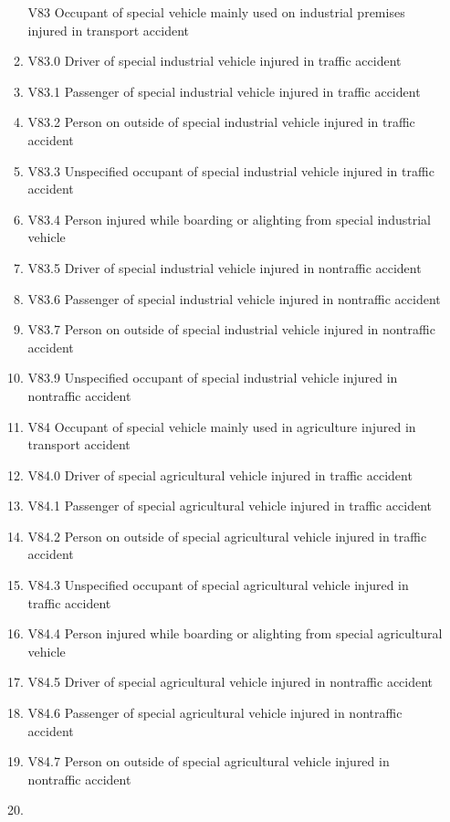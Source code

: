 \documentclass[
]{scrartcl}
\begin{document}
\begin{itemize}
\begin{enumerate}
    V83 Occupant of special vehicle mainly used on industrial premises
    injured in transport accident
  \item
    V83.0 Driver of special industrial vehicle injured in traffic
    accident
  \item
    V83.1 Passenger of special industrial vehicle injured in traffic
    accident
  \item
    V83.2 Person on outside of special industrial vehicle injured in
    traffic accident
  \item
    V83.3 Unspecified occupant of special industrial vehicle injured in
    traffic accident
  \item
    V83.4 Person injured while boarding or alighting from special
    industrial vehicle
  \item
    V83.5 Driver of special industrial vehicle injured in nontraffic
    accident
  \item
    V83.6 Passenger of special industrial vehicle injured in nontraffic
    accident
  \item
    V83.7 Person on outside of special industrial vehicle injured in
    nontraffic accident
  \item
    V83.9 Unspecified occupant of special industrial vehicle injured in
    nontraffic accident
  \item
    V84 Occupant of special vehicle mainly used in agriculture injured
    in transport accident
  \item
    V84.0 Driver of special agricultural vehicle injured in traffic
    accident
  \item
    V84.1 Passenger of special agricultural vehicle injured in traffic
    accident
  \item
    V84.2 Person on outside of special agricultural vehicle injured in
    traffic accident
  \item
    V84.3 Unspecified occupant of special agricultural vehicle injured
    in traffic accident
  \item
    V84.4 Person injured while boarding or alighting from special
    agricultural vehicle
  \item
    V84.5 Driver of special agricultural vehicle injured in nontraffic
    accident
  \item
    V84.6 Passenger of special agricultural vehicle injured in
    nontraffic accident
  \item
    V84.7 Person on outside of special agricultural vehicle injured in
    nontraffic accident
  \item

\end{enumerate}
\end{itemize}
\end{document}
